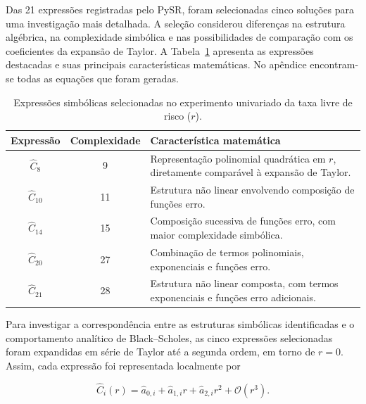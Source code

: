 Das 21 expressões registradas pelo PySR, foram
selecionadas cinco soluções para uma investigação mais
detalhada. A seleção considerou diferenças na estrutura
algébrica, na complexidade simbólica e nas possibilidades
de comparação com os coeficientes da expansão de Taylor.
A Tabela~\ref{tab:r_expressoes} apresenta as expressões
destacadas e suas principais características matemáticas. No apêndice encontram-se todas as equações que foram geradas.

\begin{table}[htbp]
\centering
\caption{Expressões simbólicas selecionadas no experimento
univariado da taxa livre de risco ($r$).}
\label{tab:r_expressoes}
\small
\setlength{\tabcolsep}{5pt}

\begin{tabular}{c c p{8cm}}
\hline
\textbf{Expressão} &
\textbf{Complexidade} &
\textbf{Característica matemática} \\
\hline

$\widehat{C}_8$ & 9 &
Representação polinomial quadrática em $r$,
diretamente comparável à expansão de Taylor. \\

$\widehat{C}_{10}$ & 11 &
Estrutura não linear envolvendo composição
de funções erro. \\

$\widehat{C}_{14}$ & 15 &
Composição sucessiva de funções erro,
com maior complexidade simbólica. \\

$\widehat{C}_{20}$ & 27 &
Combinação de termos polinomiais, exponenciais
e funções erro. \\

$\widehat{C}_{21}$ & 28 &
Estrutura não linear composta, com termos
exponenciais e funções erro adicionais. \\

\hline
\end{tabular}
\end{table}

Para investigar a correspondência entre as estruturas
simbólicas identificadas e o comportamento analítico
de Black--Scholes, as cinco expressões selecionadas
foram expandidas em série de Taylor até a segunda
ordem, em torno de $r=0$. Assim, cada expressão foi representada localmente por

\begin{equation}
\label{eq:r_taylor_pysr}
\widehat{C}_i(r)=
\widehat{a}_{0,i}
+\widehat{a}_{1,i}r
+\widehat{a}_{2,i}r^2
+\mathcal{O}(r^3).
\end{equation}


